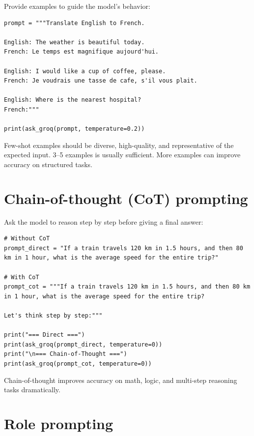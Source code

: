 Provide examples to guide the model's behavior:

\begin{verbatim}
prompt = """Translate English to French.

English: The weather is beautiful today.
French: Le temps est magnifique aujourd'hui.

English: I would like a cup of coffee, please.
French: Je voudrais une tasse de cafe, s'il vous plait.

English: Where is the nearest hospital?
French:"""

print(ask_groq(prompt, temperature=0.2))
\end{verbatim}

\begin{aitip}
Few-shot examples should be diverse, high-quality, and representative of the expected input. 3--5 examples is usually sufficient. More examples can improve accuracy on structured tasks.
\end{aitip}

\section{Chain-of-thought (CoT) prompting}

Ask the model to reason step by step before giving a final answer:

\begin{verbatim}
# Without CoT
prompt_direct = "If a train travels 120 km in 1.5 hours, and then 80 km in 1 hour, what is the average speed for the entire trip?"

# With CoT
prompt_cot = """If a train travels 120 km in 1.5 hours, and then 80 km in 1 hour, what is the average speed for the entire trip?

Let's think step by step:"""

print("=== Direct ===")
print(ask_groq(prompt_direct, temperature=0))
print("\n=== Chain-of-Thought ===")
print(ask_groq(prompt_cot, temperature=0))
\end{verbatim}

Chain-of-thought improves accuracy on math, logic, and multi-step reasoning tasks dramatically.

\section{Role prompting}

